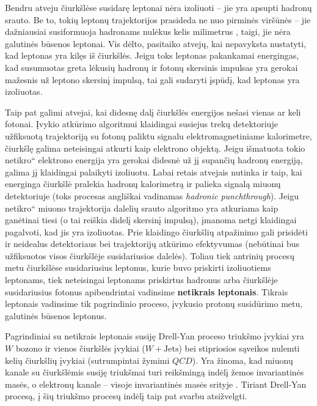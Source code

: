 \documentclass[a4paper, 12pt, oneside]{article}
\newcommand{\WJets}{W\! +\!\mathrm{Jets}}
\newcommand{\ltq}[1]{{\quotedblbase{}#1\textquotedblleft{}}}
\newcommand{\QCD}{QC\! D}
\newlength\q
\begin{document}
Bendru atveju čiurkšlėse susidarę leptonai nėra izoliuoti -- jie yra apsupti hadronų srauto.
Be to, tokių leptonų trajektorijos prasideda ne nuo pirminės viršūnės -- jie dažniausiai susiformuoja hadronams nulėkus
kelis milimetrus \cite{LeptonJets}, taigi, jie nėra galutinės būsenos leptonai.
Vis dėlto, pasitaiko atvejų, kai nepavyksta nustatyti, kad leptonas yra kilęs iš čiurkšlės.
Jeigu toks leptonas pakankamai energingas, kad susumuotas greta lėkusių hadronų ir fotonų skersinis impulsas yra gerokai
mažesnis už leptono skersinį impulsą, tai gali sudaryti įspūdį, kad leptonas yra izoliuotas.

Taip pat galimi atvejai, kai didesnę dalį čiurkšlės energijos nešasi vienas ar keli fotonai.
Įvykio atkūrimo algoritmui klaidingai susiejus trekų detektoriuje užfiksuotą trajektoriją su fotonų paliktu signalu
elektromagnetiniame kalorimetre, čiurkšlę galima neteisingai atkurti kaip elektrono objektą.
Jeigu išmatuota tokio \ltq{netikro} elektrono energija yra gerokai didesnė už jį supančių hadronų energiją, galima jį
klaidingai palaikyti izoliuotu.
Labai retais atvejais nutinka ir taip, kai energinga čiurkšlė pralekia hadronų kalorimetrą ir palieka signalą miuonų
detektoriuje (toks procesas angliškai vadinamas \textit{hadronic punchthrough}).
Jeigu \ltq{netikro} miuono trajektorija dalelių srauto algoritmo yra atkuriama kaip ganėtinai tiesi (o tai reiškia
didelį skersinį impulsą), įmanoma netgi klaidingai pagalvoti, kad jis yra izoliuotas.
Prie klaidingo čiurkšlių atpažinimo gali prisidėti ir neidealus detektoriaus bei trajektorijų atkūrimo efektyvumas
(nebūtinai bus užfiksuotos visos čiurkšlėje susidariusios dalelės).
Toliau tiek antrinių procesų metu čiurkšlėse susidariusius leptonus, kurie buvo priskirti izoliuotiems leptonams, tiek
neteisingai leptonams priskirtus hadronus arba čiurkšlėje susidariusius fotonus apibendrintai vadinsime \textbf{netikrais leptonais}.
Tikrais leptonais vadinsime tik pagrindinio proceso, įvykusio protonų susidūrimo metu, galutinės būsenos leptonus.

Pagrindiniai su netikrais leptonais susiję Drell-Yan proceso triukšmo įvykiai yra $W$ bozono ir vienos čiurkšlės
įvykiai ($\WJets$) bei stipriosios sąveikos nulemti kelių čiurkšlių įvykiai (sutrumpintai žymimi $\QCD$).
Yra žinoma, kad miuonų kanale su čiurkšlėmis susiję triukšmai turi reikšmingą indėlį žemos invariantinės masės,
o elektronų kanale -- visoje invariantinės masės srityje \cite{DY_CMS2011, DY_CMS2013, DY_CMS2015, DY_CMS2019}.
Tiriant Drell-Yan procesą, į šių triukšmo procesų indėlį taip pat svarbu atsižvelgti.
\end{document}

